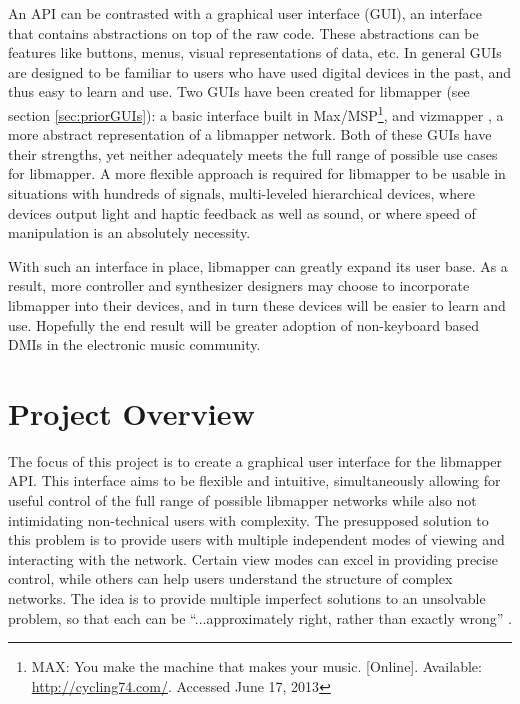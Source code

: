 An API can be contrasted with a graphical user interface (GUI), an interface that contains abstractions on top of the raw code. These abstractions can be features like buttons, menus, visual representations of data, etc. In general GUIs are designed to be familiar to users who have used digital devices in the past, and thus easy to learn and use. Two GUIs have been created for libmapper (see section \ref{sec:priorGUIs}): a basic interface built in Max/MSP\footnote{MAX: You make the machine that makes your music. [Online]. Available: \url{http://cycling74.com/}. Accessed June 17, 2013}, and vizmapper \cite{vizmapper}, a more abstract representation of a libmapper network. Both of these GUIs have their strengths, yet neither adequately meets the full range of possible use cases for libmapper. A more flexible approach is required for libmapper to be usable in situations with hundreds of signals, multi-leveled hierarchical devices, where devices output light and haptic feedback as well as sound, or where speed of manipulation is an absolutely necessity. 

With such an interface in place, libmapper can greatly expand its user base. As a result, more controller and synthesizer designers may choose to incorporate libmapper into their devices, and in turn these devices will be easier to learn and use. Hopefully the end result will be greater adoption of non-keyboard based DMIs in the electronic music community.


\section{Project Overview}

The focus of this project is to create a graphical user interface for the libmapper API. This interface aims to be flexible and intuitive, simultaneously allowing for useful control of the full range of possible libmapper networks while also not intimidating non-technical users with complexity. The presupposed solution to this problem is to provide users with multiple independent modes of viewing and interacting with the network. Certain view modes can excel in providing precise control, while others can help users understand the structure of complex networks. The idea is to provide multiple imperfect solutions to an unsolvable problem, so that each can be ``...approximately right, rather than exactly wrong'' .

